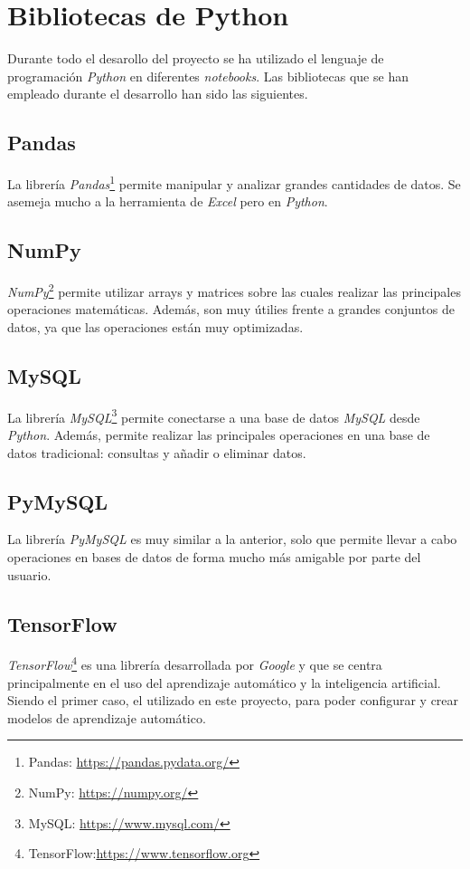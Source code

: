 \section{Bibliotecas de Python}
Durante todo el desarollo del proyecto se ha utilizado el lenguaje de programación \emph{Python} en diferentes \emph{notebooks}. Las bibliotecas que se han empleado durante el desarrollo han sido las siguientes.

\subsection{Pandas}
La librería \emph{Pandas}\footnote{Pandas: \url{https://pandas.pydata.org/}} permite manipular y analizar grandes cantidades de datos. Se asemeja mucho a la herramienta de \emph{Excel} pero en \emph{Python}.

\subsection{NumPy}
\emph{NumPy}\footnote{NumPy: \url{https://numpy.org/}} permite utilizar arrays y matrices sobre las cuales realizar las principales operaciones matemáticas. Además, son muy útilies frente a grandes conjuntos de datos, ya que las operaciones están muy optimizadas.

\subsection{MySQL}
La librería \emph{MySQL}\footnote{MySQL: \url{https://www.mysql.com/}} permite conectarse a una base de datos \emph{MySQL} desde \emph{Python}. Además, permite realizar las principales operaciones en una base de datos tradicional: consultas y añadir o eliminar datos.

\subsection{PyMySQL}
La librería \emph{PyMySQL} es muy similar a la anterior, solo que permite llevar a cabo operaciones en bases de datos de forma mucho más amigable por parte del usuario.

\subsection{TensorFlow}
\emph{TensorFlow}\footnote{TensorFlow:\url{https://www.tensorflow.org}} es una librería desarrollada por \emph{Google} y que se centra principalmente en el uso del aprendizaje automático y la inteligencia artificial. Siendo el primer caso, el utilizado en este proyecto, para poder configurar y crear modelos de aprendizaje automático.

